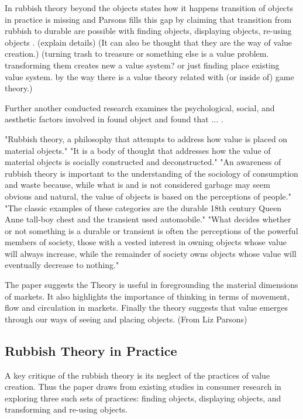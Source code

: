 In rubbish theory beyond the objects states how it happens transition of objects in practice is missing and Parsons fills this gap by claiming that transition from rubbish to durable are possible with finding objects, displaying objects, re-using objects \cite{parsons2008thompsons}. (explain details) (It can also be thought that they are the way of value creation.) (turning trash to treasure or something else is a value problem. transforming them creates new a value system? or just finding place existing value system. by the way there is a value theory related with (or inside of) game theory.)

Further another conducted research examines the psychological, social, and aesthetic factors involved in found object and found that ... \cite{camic2010trashed}.

"Rubbish theory, a philosophy that attempts to address how value is placed on material objects." "It is a body of thought that addresses how the value of material objects is socially constructed and deconstructed." "An awareness of rubbish theory is important to the understanding of the sociology of consumption and waste because, while what is and is not considered garbage may seem obvious and natural, the value of objects is based on the perceptions of people." "The classic examples of these categories are the durable 18th century Queen Anne tall-boy chest and the transient used automobile." "What decides whether or not something is a durable or transient is often the perceptions of the powerful members of society, those with a vested interest in owning objects whose value will always increase, while the remainder of society owns objects whose value will eventually decrease to nothing."

The paper suggests the Theory is useful in foregrounding the material dimensions of markets. It also highlights the importance of thinking in terms of movement, flow and circulation in markets. Finally the theory suggests that value emerges through our ways of seeing and placing objects. (From Liz Parsons)

\subsection{Rubbish Theory in Practice}
A key critique of the rubbish theory is its neglect of the practices of value creation. Thus the paper draws from existing studies in consumer research in exploring three such sets of practices: finding objects, displaying objects, and transforming and re-using objects.

